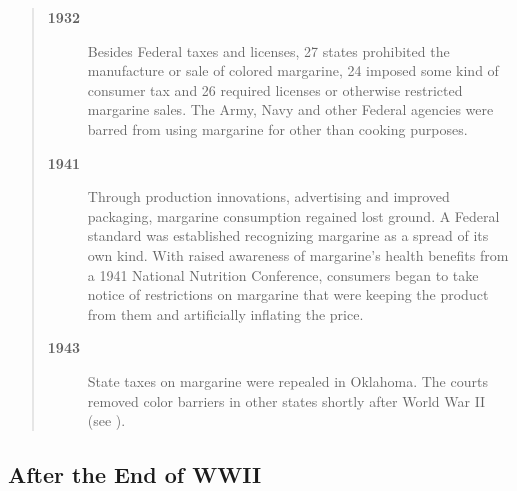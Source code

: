 \documentclass[stsc,blindrev]{informs-stsc}
\begin{document}
\begin{quotation}
\begin{description}
\item[\bf 1932] Besides Federal taxes and licenses, 27 states prohibited
the manufacture or sale of colored margarine, 24 imposed some kind
of  consumer tax and 26 required licenses or otherwise restricted
margarine sales. The Army, Navy and other Federal agencies were
barred from using margarine for other than cooking purposes.

\item[\bf 1941] Through production innovations, advertising and improved
packaging, margarine consumption regained lost ground. A Federal
standard  was established recognizing margarine as a spread of its
own kind. With raised awareness of margarine's health benefits from
a 1941 National Nutrition Conference, consumers began to take notice
of restrictions on margarine that were keeping the product from them
and artificially inflating the price.

\item[\bf 1943] State taxes on margarine were repealed in Oklahoma. The courts
removed color barriers in other states shortly after World War II (see \citealt{tjp}).

\end{description}

\end{quotation}


\subsection{After the End of WWII}
\end{document}
